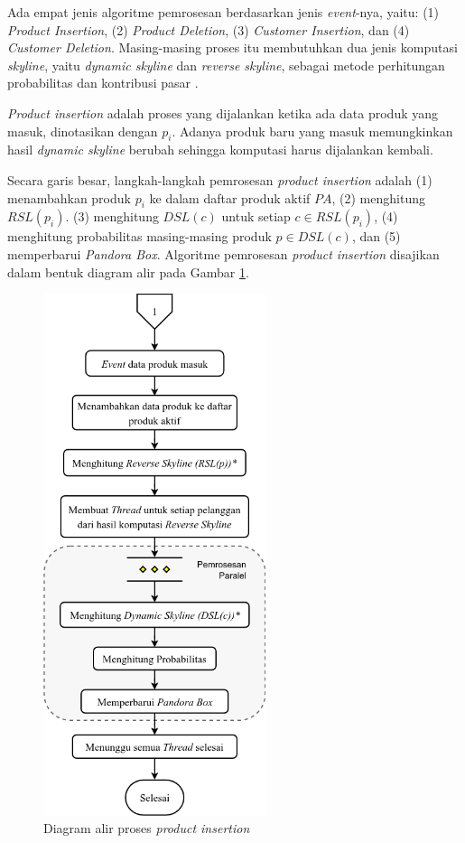 Ada empat jenis algoritme pemrosesan berdasarkan jenis \textit{event}-nya, yaitu: (1) \textit{Product Insertion}, (2) \textit{Product Deletion}, (3) \textit{Customer Insertion}, dan (4) \textit{Customer Deletion}. Masing-masing proses itu membutuhkan dua jenis komputasi \textit{skyline}, yaitu \textit{dynamic skyline} dan \textit{reverse skyline}, sebagai metode perhitungan probabilitas dan kontribusi pasar \cite{kmpp}. 


\textit{Product insertion} adalah proses yang dijalankan ketika ada data produk yang masuk, dinotasikan dengan $p_{i}$. Adanya produk baru yang masuk memungkinkan hasil \textit{dynamic skyline} berubah sehingga komputasi harus dijalankan kembali.
 
Secara garis besar, langkah-langkah pemrosesan \textit{product insertion} adalah (1) menambahkan produk $p_{i}$ ke dalam daftar produk aktif $PA$, (2) menghitung $RSL(p_{i})$. (3) menghitung $DSL(c)$ untuk setiap $c \in RSL(p_{i})$, (4) menghitung probabilitas masing-masing produk $p \in DSL(c)$, dan (5) memperbarui \textit{Pandora Box}. Algoritme pemrosesan \textit{product insertion} disajikan dalam bentuk diagram alir pada Gambar \ref{fig:flowchart-pi}.

\begin{figure}[H]
	\centering
	\includegraphics[width=6.5cm]{assets/img/bab3/flowchart-pi.png}
	\caption{Diagram alir proses \textit{product insertion}}
	\label{fig:flowchart-pi}
\end{figure}


